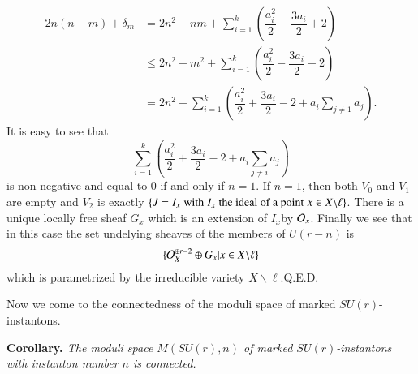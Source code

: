 \begin{itemize}
\begin{equation*}
\begin{split}
2n(n-m)+ \delta_{m} & = 2n^{2}-nm + \sum\limits_{i=1}^{k}\left(\dfrac{a_{i}^{2}}{2}- \dfrac{3a_{i}}{2} + 2\right)\\
& \leq 2n^{2}-m^{2} + \sum\limits_{i=1}^{k}\left(\dfrac{a_{i}^{2}}{2}-\dfrac{3a_{i}}{2} + 2 \right)\\
&= 2n^{2}- \sum\limits_{i=1}^{k}\left(\dfrac{a_{i}^{2}}{2} + \dfrac{3a_{i}}{2}-2 +a_{i}\sum\limits_{j \neq 1}a_{j}\right).
\end{split}
\end{equation*}
It is easy to see that
$$
\sum\limits_{i=1}^{k}\left(\dfrac{a_{i}^{2}}{2} + \dfrac{3a_{i}}{2}-2 +a_{i} \sum\limits_{j \neq i}a_{j}\right)
$$
is non-negative and equal to $0$ if and only if $n=1$. If $n=1$, then both  $V_{0}$ and $V_{1}$ are empty and $V_{2}$ is exactly $\{J=I_{x}\; \text{with}\; I_{x}\;\break \text{the ideal of a point} \;x \in X \backslash \ell \}$. There is a unique locally free sheaf $G_{x}$ which is an extension of $I_{x}$\pageoriginale by $\mathcal{O}_{x}$. Finally we see that in this case the set undelying sheaves of the members of $U(r-n)$ is
$$
\{\mathcal{O}_{X}^{\oplus  r-2} \oplus G_{x}| x \in X \backslash \ell\}
$$
which is parametrized by the irreducible variety $X\backslash \ell$.\hfill Q.E.D.

 Now we come to the connectedness of the moduli space of marked $SU(r)$-instantons.
\end{itemize}

\medskip
\noindent
{\bfseries  {} Corollary. \label{chap12-coro-3.11}} \textit{The moduli space $M(SU(r), n)$ of marked $SU(r)$-instantons with instanton number $n$ is connected.}


